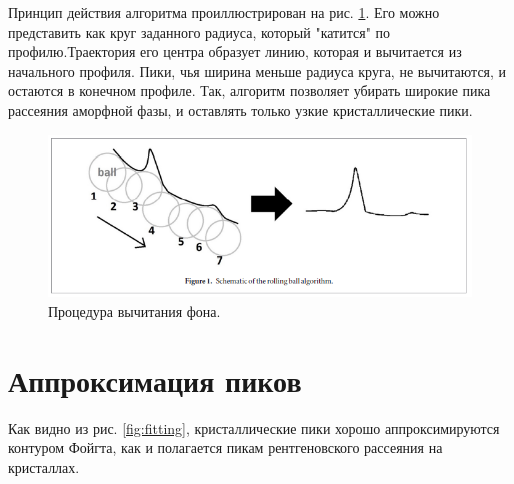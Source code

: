 	Принцип действия алгоритма проиллюстрирован на рис. \ref{fig:ball}. 
	Его можно представить как круг заданного радиуса, который "катится" по профилю.Траектория его центра образует линию, которая и вычитается из начального профиля. Пики, чья ширина меньше радиуса круга, не вычитаются, и остаются в конечном профиле. Так, алгоритм позволяет убирать широкие пика рассеяния аморфной фазы, и оставлять только узкие кристаллические пики.
	
	
	\begin{figure}[ht]
	    \centering
	    \includegraphics[width=\linewidth]{fig/ball.PNG}
	    \caption{Процедура вычитания фона.}
	    \label{fig:ball}
	\end{figure}

	\section{Аппроксимация пиков}
	
	Как видно из рис. \ref{fig:fitting}, кристаллические пики хорошо аппроксимируются контуром Фойгта, как и полагается пикам рентгеновского рассеяния на кристаллах.
	

